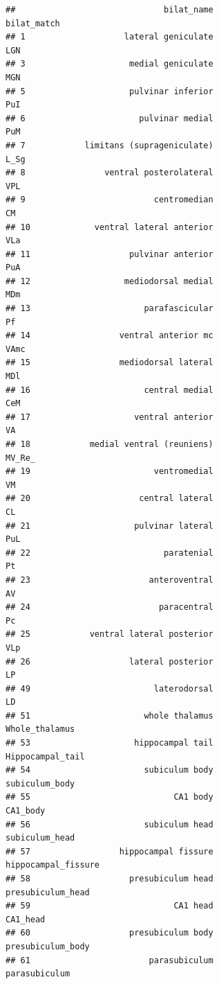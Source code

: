 \documentclass[
]{article}
\begin{document}
\begin{verbatim}
##                              bilat_name                  bilat_match
## 1                    lateral geniculate                          LGN
## 3                     medial geniculate                          MGN
## 5                     pulvinar inferior                          PuI
## 6                       pulvinar medial                          PuM
## 7            limitans (suprageniculate)                         L_Sg
## 8                ventral posterolateral                          VPL
## 9                          centromedian                           CM
## 10             ventral lateral anterior                          VLa
## 11                    pulvinar anterior                          PuA
## 12                   mediodorsal medial                          MDm
## 13                       parafascicular                           Pf
## 14                  ventral anterior mc                         VAmc
## 15                  mediodorsal lateral                          MDl
## 16                       central medial                          CeM
## 17                     ventral anterior                           VA
## 18            medial ventral (reuniens)                       MV_Re_
## 19                         ventromedial                           VM
## 20                      central lateral                           CL
## 21                     pulvinar lateral                          PuL
## 22                           paratenial                           Pt
## 23                        anteroventral                           AV
## 24                          paracentral                           Pc
## 25            ventral lateral posterior                          VLp
## 26                    lateral posterior                           LP
## 49                         laterodorsal                           LD
## 51                       whole thalamus               Whole_thalamus
## 53                     hippocampal tail             Hippocampal_tail
## 54                       subiculum body               subiculum_body
## 55                             CA1 body                     CA1_body
## 56                       subiculum head               subiculum_head
## 57                  hippocampal fissure          hippocampal_fissure
## 58                    presubiculum head            presubiculum_head
## 59                             CA1 head                     CA1_head
## 60                    presubiculum body            presubiculum_body
## 61                        parasubiculum                parasubiculum

\end{verbatim}
\end{document}
